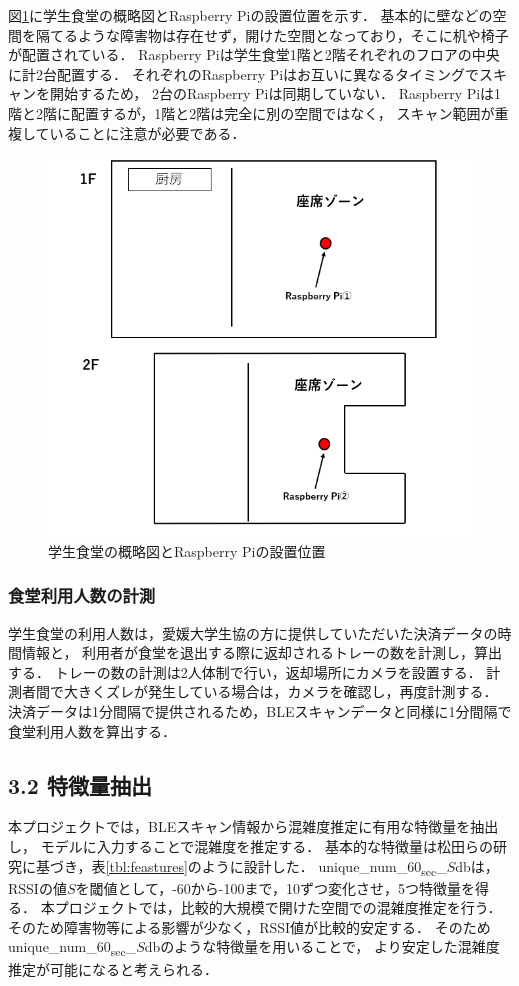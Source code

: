 図\ref{raspi_place}に学生食堂の概略図とRaspberry Piの設置位置を示す．
基本的に壁などの空間を隔てるような障害物は存在せず，開けた空間となっており，そこに机や椅子が配置されている．
Raspberry Piは学生食堂1階と2階それぞれのフロアの中央に計2台配置する．
それぞれのRaspberry Piはお互いに異なるタイミングでスキャンを開始するため，
2台のRaspberry Piは同期していない．
Raspberry Piは1階と2階に配置するが，1階と2階は完全に別の空間ではなく，
スキャン範囲が重複していることに注意が必要である．
\begin{figure}[pt]
  \includegraphics[scale=0.4]{./images/raspi_place.png}
  \centering
  \caption{学生食堂の概略図とRaspberry Piの設置位置\label{raspi_place}}
\end{figure}

\subsubsection*{食堂利用人数の計測}
学生食堂の利用人数は，愛媛大学生協の方に提供していただいた決済データの時間情報と，
利用者が食堂を退出する際に返却されるトレーの数を計測し，算出する．
トレーの数の計測は2人体制で行い，返却場所にカメラを設置する．
計測者間で大きくズレが発生している場合は，カメラを確認し，再度計測する．
決済データは1分間隔で提供されるため，BLEスキャンデータと同様に1分間隔で食堂利用人数を算出する．

\subsection*{3.2 特徴量抽出}
本プロジェクトでは，BLEスキャン情報から混雑度推定に有用な特徴量を抽出し，
モデルに入力することで混雑度を推定する．
基本的な特徴量は松田らの研究\cite{senkou}に基づき，表\ref{tbl:feastures}のように設計した．
unique\_num\_60\textsubscript{sec}\_$S$dbは，
RSSIの値$S$を閾値として，-60から-100まで，10ずつ変化させ，5つ特徴量を得る．
本プロジェクトでは，比較的大規模で開けた空間での混雑度推定を行う．
そのため障害物等による影響が少なく，RSSI値が比較的安定する．
そのためunique\_num\_60\textsubscript{sec}\_$S$dbのような特徴量を用いることで，
より安定した混雑度推定が可能になると考えられる．


